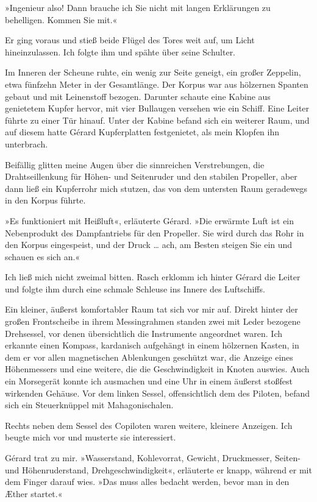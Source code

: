»Ingenieur also! Dann brauche ich Sie nicht mit langen Erklärungen
zu behelligen. Kommen Sie mit.«

Er ging voraus und stieß beide Flügel des Tores weit auf, um Licht
hineinzulassen. Ich folgte ihm und spähte über seine Schulter.

\bigpar

Im Inneren der Scheune ruhte, ein wenig zur Seite geneigt, ein
großer Zeppelin, etwa fünfzehn Meter in der Gesamtlänge. Der Korpus
war aus hölzernen Spanten gebaut und mit Leinenstoff bezogen.
Darunter schaute eine Kabine aus genietetem Kupfer hervor, mit vier
Bullaugen versehen wie ein Schiff. Eine Leiter führte zu einer Tür
hinauf. Unter der Kabine befand sich ein weiterer Raum, und auf
diesem hatte Gérard Kupferplatten festgenietet, als mein Klopfen
ihn unterbrach.

Beifällig glitten meine Augen über die sinnreichen Verstrebungen,
die Drahtseillenkung für Höhen- und Seitenruder und den stabilen
Propeller, aber dann ließ ein Kupferrohr mich stutzen, das von dem
untersten Raum geradewegs in den Korpus führte.

»Es funktioniert mit Heißluft«, erläuterte Gérard. »Die erwärmte
Luft ist ein Nebenprodukt des Dampfantriebs für den Propeller. Sie
wird durch das Rohr in den Korpus eingespeist, und der Druck \ldots{}
ach, am Besten steigen Sie ein und schauen es sich an.«

Ich ließ mich nicht zweimal bitten. Rasch erklomm ich hinter Gérard
die Leiter und folgte ihm durch eine schmale Schleuse ins Innere
des Luftschiffs.

Ein kleiner, äußerst komfortabler Raum tat sich vor mir auf. Direkt
hinter der großen Frontscheibe in ihrem Messingrahmen standen zwei
mit Leder bezogene Drehsessel, vor denen übersichtlich die
Instrumente angeordnet waren. Ich erkannte einen Kompass,
kardanisch aufgehängt in einem hölzernen Kasten, in dem er vor
allen magnetischen Ablenkungen geschützt war, die Anzeige eines
Höhenmessers und eine weitere, die die Geschwindigkeit in Knoten
auswies. Auch ein Morsegerät konnte ich ausmachen und eine Uhr in
einem äußerst stoßfest wirkenden Gehäuse. Vor dem linken Sessel,
offensichtlich dem des Piloten, befand sich ein Steuerknüppel mit
Mahagonischalen.

Rechts neben dem Sessel des Copiloten waren weitere, kleinere
Anzeigen. Ich beugte mich vor und musterte sie interessiert.

Gérard trat zu mir. »Wasserstand, Kohlevorrat, Gewicht,
Druckmesser, Seiten- und Höhenruderstand, Drehgeschwindigkeit«,
erläuterte er knapp, während er mit dem Finger darauf wies. »Das
muss alles bedacht werden, bevor man in den Æther startet.«

